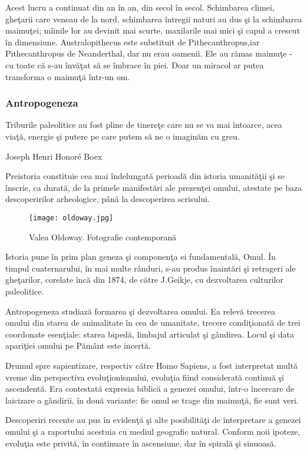 Acest lucru a continuat din an în an, din secol în secol. Schimbarea climei, gheţarii care veneau de la nord, schimbarea întregii naturi au dus şi la schimbarea maimuţei; mîinile lor au devinit mai scurte, maxilarile mai mici şi capul a crescut în dimensiune. Australopithecus este substituit de Pithecanthropus,iar Pithecanthropus de Neanderthal, dar nu erau oamenii. Ele au rămas maimuţe - cu toate că s-au învăţat să se îmbrace în piei. Doar un miracol ar putea transforma o maimuţă într-un om. 
\subsubsection{Antropogeneza}
\epigraph{Triburile paleolitice au fost pline de tinereţe care nu se va mai întoarce, acea viaţă, energie şi putere pe care putem să ne o imaginăm cu greu.}{Joseph Henri Honoré Boex}

Preistoria constituie cea mai îndelungată perioadă din istoria umanităţii şi se înscrie, ca durată, de la primele manifestări ale prezenţei omului, atestate pe baza descoperirilor arheologice, până la descoperirea scrisului.

\begin{wrapfigure}[10]{l}{0.3\linewidth} 
    \texttt{[image: oldoway.jpg]}
    \caption{Valea Oldoway. Fotografie contemporană}
    \label{fig:pca}
\end{wrapfigure}
Istoria pune în prim plan geneza şi componenţa ei fundamentală, Omul. În timpul cuaternarului, în mai multe rânduri, s-au produs înaintări şi retrageri ale gheţarilor, corelate încă din 1874, de către J.Geikje, cu dezvoltarea culturilor paleolitice.

Antropogeneza studiază formarea şi dezvoltarea omului. Ea relevă trecerea omului din starea de animalitate în cea de umanitate, trecere condiţionată de trei coordonate esenţiale: starea bipedă, limbajul articulat şi gândirea. Locul şi data apariţiei omului pe Pământ este incertă.

Drumul spre sapientizare, respectiv către Homo Sapiens, a fost interpretat multă vreme din perspectiva evoluţionismului, evoluţia fiind considerată continuă şi ascendentă. Era contestată expresia biblică a genezei omului, într-o încercare de laicizare a gândirii, în două variante: fie omul se trage din maimuţă, fie sunt veri.

Descoperiri recente au pus în evidenţă şi alte posibilităţi de interpretare a genezei omului şi a raportului acestuia cu mediul geografic natural. Conform noii ipoteze, evoluţia este privită, în continuare în ascensiune, dar în spirală şi sinuoasă.

